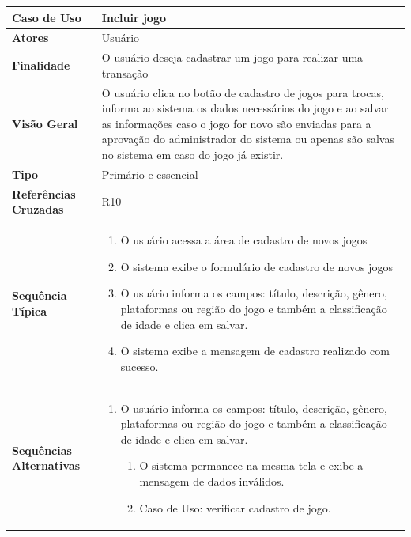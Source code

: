 \documentclass[a4paper,11pt]{article}
\begin{document}
\begin{table}[H]
		\begin{tabularx}{\textwidth}{|l|X|}
		\hline
			\textbf{Caso de Uso} &  Incluir jogo \\ \hline
			\textbf{Atores} &  Usuário \\ \hline
			\textbf{Finalidade} &  O usuário deseja cadastrar um jogo para realizar uma transação \\ \hline
			\textbf{Visão Geral} &  O usuário clica no botão de cadastro de jogos para trocas, informa ao sistema os dados necessários do jogo e ao salvar as informações caso o jogo for novo são enviadas para a aprovação do administrador do sistema ou apenas são salvas no sistema em caso do jogo já existir. \\ \hline
			\textbf{Tipo} & Primário e essencial \\ \hline
			\textbf{Referências Cruzadas} & R10 \\ \hline
			\textbf{Sequência Típica} & 
			\begin{enumerate}
			\item O usuário acessa a área de cadastro de novos jogos
			\item O sistema exibe o formulário de cadastro de novos jogos
			\item O usuário informa os campos: título, descrição, gênero, plataformas ou região do jogo e também a classificação de idade e clica em salvar.
			\item O sistema exibe a mensagem de cadastro realizado com sucesso.
						
			
			\end{enumerate} \\ \hline
			\textbf{Sequências Alternativas} & 
			\begin{enumerate}
			\item O usuário informa os campos: título, descrição, gênero, plataformas ou região do jogo e também a classificação de idade e clica em salvar.
			\begin{enumerate}
			\item O sistema permanece na mesma tela e exibe a mensagem de dados inválidos.
			\item Caso de Uso: verificar cadastro de jogo.
			\end{enumerate}
			\end{enumerate} \\ \hline
		\end{tabularx}
\end{table}
\end{document}
